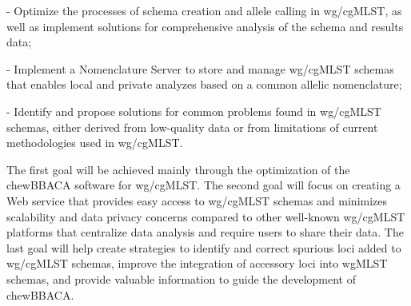 - Optimize the processes of schema creation and allele calling in \ac{wg/cgMLST}, as well as implement solutions for comprehensive analysis of the schema and results data;

- Implement a Nomenclature Server to store and manage \ac{wg/cgMLST} schemas that enables local and private analyzes based on a common allelic nomenclature;

- Identify and propose solutions for common problems found in \ac{wg/cgMLST} schemas, either derived from low-quality data or from limitations of current methodologies used in \ac{wg/cgMLST}.

The first goal will be achieved mainly through the optimization of the chewBBACA software for \ac{wg/cgMLST}. The second goal will focus on creating a Web service that provides easy access to \ac{wg/cgMLST} schemas and minimizes scalability and data privacy concerns compared to other well-known \ac{wg/cgMLST} platforms that centralize data analysis and require users to share their data. The last goal will help create strategies to identify and correct spurious loci added to \ac{wg/cgMLST} schemas, improve the integration of accessory loci into \ac{wgMLST} schemas, and provide valuable information to guide the development of chewBBACA.
